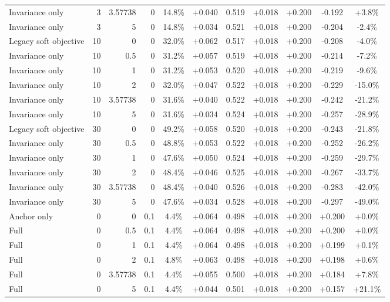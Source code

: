 \begin{table}[htbp]
\begin{tabular}{lrrrccccccc}
Invariance only & 3 & 3.57738 & 0 & 14.8\% & +0.040 & 0.519 & +0.018 & +0.200 & -0.192 & +3.8\% \\
Invariance only & 3 & 5 & 0 & 14.8\% & +0.034 & 0.521 & +0.018 & +0.200 & -0.204 & -2.4\% \\
Legacy soft objective & 10 & 0 & 0 & 32.0\% & +0.062 & 0.517 & +0.018 & +0.200 & -0.208 & -4.0\% \\
Invariance only & 10 & 0.5 & 0 & 31.2\% & +0.057 & 0.519 & +0.018 & +0.200 & -0.214 & -7.2\% \\
Invariance only & 10 & 1 & 0 & 31.2\% & +0.053 & 0.520 & +0.018 & +0.200 & -0.219 & -9.6\% \\
Invariance only & 10 & 2 & 0 & 32.0\% & +0.047 & 0.522 & +0.018 & +0.200 & -0.229 & -15.0\% \\
Invariance only & 10 & 3.57738 & 0 & 31.6\% & +0.040 & 0.522 & +0.018 & +0.200 & -0.242 & -21.2\% \\
Invariance only & 10 & 5 & 0 & 31.6\% & +0.034 & 0.524 & +0.018 & +0.200 & -0.257 & -28.9\% \\
Legacy soft objective & 30 & 0 & 0 & 49.2\% & +0.058 & 0.520 & +0.018 & +0.200 & -0.243 & -21.8\% \\
Invariance only & 30 & 0.5 & 0 & 48.8\% & +0.053 & 0.522 & +0.018 & +0.200 & -0.252 & -26.2\% \\
Invariance only & 30 & 1 & 0 & 47.6\% & +0.050 & 0.524 & +0.018 & +0.200 & -0.259 & -29.7\% \\
Invariance only & 30 & 2 & 0 & 48.4\% & +0.046 & 0.525 & +0.018 & +0.200 & -0.267 & -33.7\% \\
Invariance only & 30 & 3.57738 & 0 & 48.4\% & +0.040 & 0.526 & +0.018 & +0.200 & -0.283 & -42.0\% \\
Invariance only & 30 & 5 & 0 & 47.6\% & +0.034 & 0.528 & +0.018 & +0.200 & -0.297 & -49.0\% \\
Anchor only & 0 & 0 & 0.1 & 4.4\% & +0.064 & 0.498 & +0.018 & +0.200 & +0.200 & +0.0\% \\
Full & 0 & 0.5 & 0.1 & 4.4\% & +0.064 & 0.498 & +0.018 & +0.200 & +0.200 & +0.0\% \\
Full & 0 & 1 & 0.1 & 4.4\% & +0.064 & 0.498 & +0.018 & +0.200 & +0.199 & +0.1\% \\
Full & 0 & 2 & 0.1 & 4.8\% & +0.063 & 0.498 & +0.018 & +0.200 & +0.198 & +0.6\% \\
Full & 0 & 3.57738 & 0.1 & 4.4\% & +0.055 & 0.500 & +0.018 & +0.200 & +0.184 & +7.8\% \\
Full & 0 & 5 & 0.1 & 4.4\% & +0.044 & 0.501 & +0.018 & +0.200 & +0.157 & +21.1\% \\

\end{tabular}
\end{table}
